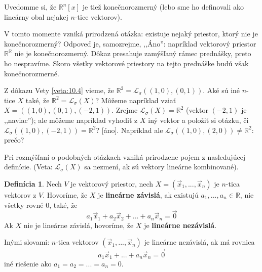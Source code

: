 \documentclass[11pt,a4paper]{article}
\theoremstyle{definition}
\newtheorem{definicia}{Definícia}[section]
\theoremstyle{plain}
\theoremstyle{remark}
\newcommand{\R}{\mathbb{R}}
\newcommand{\Lo}{\mathcal{L}_\sigma} %
\begin{document}
Uvedomme si, že $\R^n[x]$ je tiež konečnorozmerný (lebo sme ho definovali ako lineárny obal nejakej $n$-tice vektorov).

V tomto momente vzniká prirodzená otázka: existuje nejaký priestor, ktorý nie je konečnorozmerný?
Odpoveď je, samozrejme, ,,Áno'': napríklad vektorový priestor $\R^\R$ nie je konečnorozmerný. Dôkaz presahuje zamýšľaný rámec prednášky, preto ho nespravíme.
Skoro všetky vektorové priestory na tejto prednáške budú však konečnorozmerné.

Z dôkazu Vety \ref{veta:10.4} vieme, že $\R^{2}=\Lo((1,0),(0,1))$.
Aké sú iné $n$-tice $X$ také, že $\R^{2}=\Lo(X)$?
Môžeme napríklad vziať $X=((1,0),(0,1),(-2,1))$. Zrejme $\Lo(X)=\R^{2}$ (vektor $(-2,1)$ je ,,naviac''); ale môžeme napríklad vyhodiť z $X$ iný vektor a položiť si otázku, či $\Lo((1,0),(-2,1))=\R^{2}$? [áno]. Napríklad ale $\Lo((1,0),(2,0)) \ne \R^{2}$: prečo?

Pri rozmýšľaní o podobných otázkach vzniká prirodzene pojem z nasledujúcej definície.
(Veta: $\Lo(X)$ sa nezmení, ak sú vektory lineárne kombinované).

\begin{definicia} \label{def:10.5}
Nech $V$ je vektorový priestor, nech $X=(\vec{x}_{1},...,\vec{x}_{n})$ je $n$-tica vektorov z $V$. Hovoríme, že $X$ je \textbf{lineárne závislá}, ak existujú $a_1,..., a_n \in \R$, nie všetky rovné $0$, také, že
$$ a_{1}\vec{x}_{1}+a_{2}\vec{x}_{2}+...+a_{n}\vec{x}_{n}=\vec{0} $$
Ak $X$ nie je lineárne závislá, hovoríme, že $X$ je \textbf{lineárne nezávislá}.
\end{definicia}

Inými slovami: $n$-tica vektorov $(\vec{x}_{1},...,\vec{x}_{n})$ je lineárne nezávislá, ak má rovnica
\begin{equation}\label{eq:linkombJeNula}
a_{1}\vec{x}_{1}+...+a_{n}\vec{x}_{n}=\vec{0}
\end{equation}
iné riešenie ako $a_{1}=a_{2}=...=a_{n}=0$.
\end{document}
